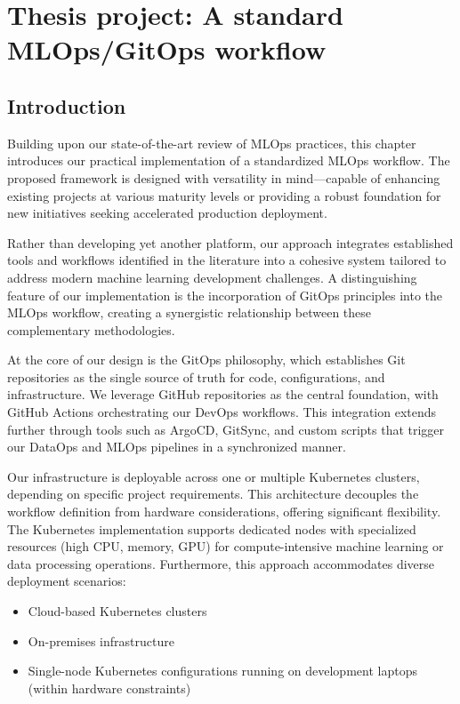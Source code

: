 \chapter{Thesis project: A standard MLOps/GitOps workflow}\label{ch:thesis-project:-a-standard-mlops-ci/cd-workflow}
\section{Introduction}\label{sec:introduction}
Building upon our state-of-the-art review of MLOps practices, this chapter introduces our practical implementation of a standardized MLOps workflow.
The proposed framework is designed with versatility in mind—capable of enhancing existing projects at various maturity levels or providing a robust foundation for new initiatives seeking accelerated production deployment.

Rather than developing yet another platform, our approach integrates established tools and workflows identified in the literature into a cohesive system tailored to address modern machine learning development challenges.
A distinguishing feature of our implementation is the incorporation of GitOps principles into the MLOps workflow, creating a synergistic relationship between these complementary methodologies.

At the core of our design is the GitOps philosophy, which establishes Git repositories as the single source of truth for code, configurations, and infrastructure.
We leverage GitHub repositories as the central foundation, with GitHub Actions orchestrating our DevOps workflows.
This integration extends further through tools such as ArgoCD, GitSync, and custom scripts that trigger our DataOps and MLOps pipelines in a synchronized manner.

Our infrastructure is deployable across one or multiple Kubernetes clusters, depending on specific project requirements.
This architecture decouples the workflow definition from hardware considerations, offering significant flexibility.
The Kubernetes implementation supports dedicated nodes with specialized resources (high CPU, memory, GPU) for compute-intensive machine learning or data processing operations.
Furthermore, this approach accommodates diverse deployment scenarios:

\begin{itemize}
\item Cloud-based Kubernetes clusters
\item On-premises infrastructure
\item Single-node Kubernetes configurations running on development laptops (within hardware constraints)
\end{itemize}


